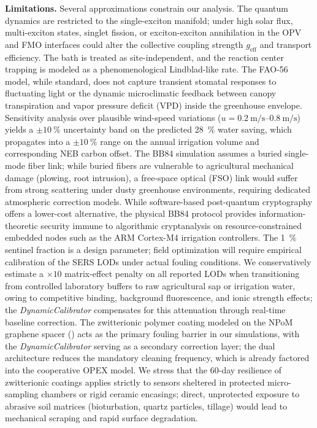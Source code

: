 \documentclass[preprint,12pt]{elsarticle}
\begin{document}
\textbf{Limitations.} Several approximations constrain our analysis.
The quantum dynamics are restricted to the single-exciton manifold; under high solar flux, multi-exciton states, singlet fission, or exciton-exciton annihilation in the OPV and FMO interfaces could alter the collective coupling strength $g_{\mathrm{eff}}$ and transport efficiency.
The bath is treated as site-independent, and the reaction center trapping is modeled as a phenomenological Lindblad-like rate.
The FAO-56 model, while standard, does not capture transient stomatal responses to fluctuating light or the dynamic microclimatic feedback between canopy transpiration and vapor pressure deficit (VPD) inside the greenhouse envelope. Sensitivity analysis over plausible wind-speed variations ($u = \qtyrange{0.2}{0.8}{\m\per\s}$) yields a $\pm\qty{10}{\percent}$ uncertainty band on the predicted \qty{28}{\percent} water saving, which propagates into a $\pm\qty{10}{\percent}$ range on the annual irrigation volume and corresponding NEB carbon offset.
The BB84 simulation assumes a buried single-mode fiber link; while buried fibers are vulnerable to agricultural mechanical damage (plowing, root intrusion), a free-space optical (FSO) link would suffer from strong scattering under dusty greenhouse environments, requiring dedicated atmospheric correction models. While software-based post-quantum cryptography offers a lower-cost alternative, the physical BB84 protocol provides information-theoretic security immune to algorithmic cryptanalysis on resource-constrained embedded nodes such as the ARM Cortex-M4 irrigation controllers.
The \qty{1}{\percent} sentinel fraction is a design parameter; field optimization will require empirical calibration of the SERS LODs under actual fouling conditions. We conservatively estimate a $\times 10$ matrix-effect penalty on all reported LODs when transitioning from controlled laboratory buffers to raw agricultural sap or irrigation water, owing to competitive binding, background fluorescence, and ionic strength effects; the \textit{DynamicCalibrator} compensates for this attenuation through real-time baseline correction. The zwitterionic polymer coating modeled on the NPoM graphene spacer () acts as the primary fouling barrier in our simulations, with the \textit{DynamicCalibrator} serving as a secondary correction layer; the dual architecture reduces the mandatory cleaning frequency, which is already factored into the cooperative OPEX model. We stress that the 60-day resilience of zwitterionic coatings applies strictly to sensors sheltered in protected micro-sampling chambers or rigid ceramic encasings; direct, unprotected exposure to abrasive soil matrices (bioturbation, quartz particles, tillage) would lead to mechanical scraping and rapid surface degradation.
\end{document}
